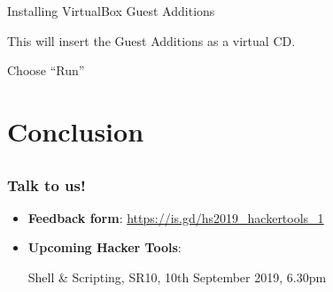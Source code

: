 \documentclass[11pt]{beamer}
\begin{document}
\begin{frame}{Installing VirtualBox Guest Additions}

  This will insert the Guest Additions as a virtual CD.

  Choose ``Run''
\end{frame}

\section{Conclusion}
\subsection{}
\begin{frame}
  \frametitle{Talk to us!}
  \begin{itemize}
    \item \textbf{Feedback form}: \url{https://is.gd/hs2019_hackertools_1}
    \item \textbf{Upcoming Hacker Tools}:

          Shell \& Scripting, SR10, 10th September 2019, 6.30pm
  \end{itemize}
\end{frame}
\end{document}

